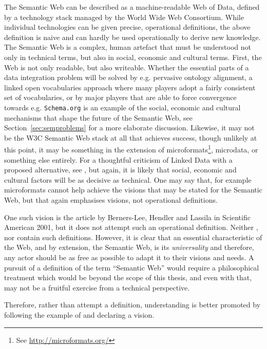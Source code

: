 The Semantic Web can be described as a machine-readable Web of Data,
defined by a technology stack managed by the World Wide Web
Consortium. While individual technologies can be given precise,
operational definitions, the above definition is naive and can hardly
be used operationally to derive new knowledge. The Semantic Web is a
complex, human artefact that must be understood not only in technical
terms, but also in social, economic and cultural terms. First, the Web
is not only readable, but also writeable. Whether the essential parts
of a data integration problem will be solved by e.g. pervasive
ontology alignment, a linked open vocabularies approach where many
players adopt a fairly consistent set of vocabularies, or by major
players that are able to force convergence towards e.g. \texttt{Schema.org}
is an example of the social, economic and cultural mechanisms that
shape the future of the Semantic Web, see
Section~\ref{sec:semproblems} for a more elaborate
discussion. Likewise, it may not be the W3C Semantic Web stack at all
that achieves success, though unlikely at this point, it may be
something in the extension of microformats\footnote{See
  \url{http://microformats.org/}}, microdata\cite{microdata}, or
something else entirely. For a thoughtful criticism of Linked Data
with a proposed alternative, see \cite{darobin1}, but again, it is
likely that social, economic and cultural factors will be as decisive
as technical. One may say that, for example microformats cannot help achieve
the visions that may be stated for the Semantic Web, but that again
emphasises visions, not operational definitions.

One such vision is the article by Berners-Lee, Hendler and Lassila in
Scientific American 2001\cite{berners2001semantic}, but it does not attempt such an
operational definition. Neither \cite{semwebroadmap},
\cite{berners2000weaving} nor \cite{Allemang:2008:SWW:1386668} contain
such definitions. However, it is clear that an essential
characteristic of the Web, and by extension, the Semantic Web, is its
\emph{universality} and therefore, any actor should be as free as
possible to adapt it to their visions and needs. A pursuit of a
definition of the term ``Semantic Web'' would require a philosophical
treatment which would be beyond the scope of this thesis, and even
with that, may not be a fruitful exercise from a technical
perspective. 

Therefore, rather than attempt a definition, understanding is better
promoted by following the example of \cite{berners2001semantic} and
declaring a vision.


